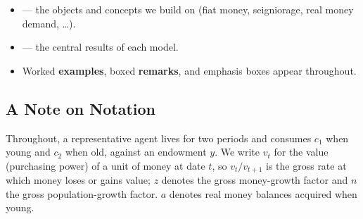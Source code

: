 \documentclass[oneside]{book}
\begin{document}
\begin{itemize}
    \item {} --- the objects and concepts we build on (fiat money, seigniorage, real money demand, \dots).
    \item {} --- the central results of each model.
    \item Worked \textbf{examples}, boxed \textbf{remarks}, and emphasis boxes appear throughout.
\end{itemize}

\subsection*{A Note on Notation}

Throughout, a representative agent lives for two periods and consumes $c_1$ when young and $c_2$ when old, against an endowment $y$. We write $v_t$ for the value (purchasing power) of a unit of money at date $t$, so $v_t/v_{t+1}$ is the gross rate at which money loses or gains value; $z$ denotes the gross money-growth factor and $n$ the gross population-growth factor. $a$ denotes real money balances acquired when young.

\newpage

\setcounter{tocdepth}{1}
\tableofcontents
\newpage








\end{document}

